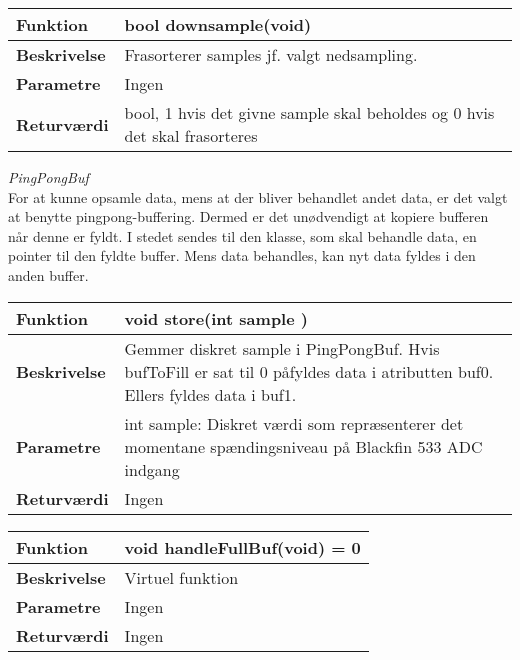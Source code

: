 \begin{center}
    \begin{tabular}{ | l | p{10cm} |}
    \hline
    \textbf{Funktion}	 	& bool downsample(void)								\\ \hline
    \textbf{Beskrivelse} 	& Frasorterer samples jf. valgt nedsampling. 							\\ \hline
    \textbf{Parametre}		& Ingen					\\ \hline
    \textbf{Returværdi} 	& bool, 1 hvis det givne sample skal beholdes og 0 hvis det skal frasorteres							\\ \hline
    \end{tabular}
\end{center}

\textit{PingPongBuf} \\
For at kunne opsamle data, mens at der bliver behandlet andet data, er det valgt at benytte pingpong-buffering. Dermed er det unødvendigt at kopiere bufferen når denne er fyldt. I stedet sendes til den klasse, som skal behandle data, en pointer til den fyldte buffer. Mens data behandles, kan nyt data fyldes i den anden buffer. 

\begin{center}
    \begin{tabular}{ | l | p{10cm} |}
    \hline
    \textbf{Funktion}	 	& void store(int sample )											\\ \hline
    \textbf{Beskrivelse} 	& Gemmer diskret sample i PingPongBuf. Hvis bufToFill er sat til 0 påfyldes data i atributten buf0. Ellers fyldes data i buf1.					\\ \hline
    \textbf{Parametre}		& int sample: Diskret værdi som repræsenterer det momentane spændingsniveau på Blackfin 533 ADC indgang														 		\\ \hline
    \textbf{Returværdi} 	& Ingen		 												\\ \hline
    \end{tabular}
\end{center}

\begin{center}
    \begin{tabular}{ | l | p{10cm} |}
    \hline
    \textbf{Funktion}	 	& void handleFullBuf(void) = 0									\\ \hline
    \textbf{Beskrivelse} 	& Virtuel funktion												\\ \hline
    \textbf{Parametre}		& Ingen			 												\\ \hline
    \textbf{Returværdi} 	& Ingen		 													\\ \hline
    \end{tabular}
\end{center}

